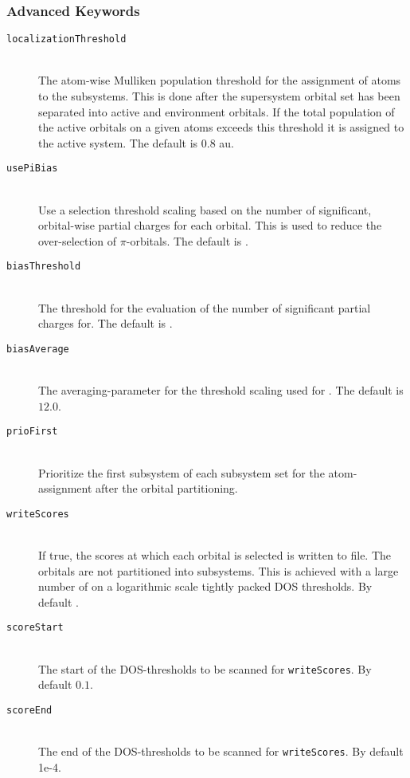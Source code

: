 \subsubsection{Advanced Keywords}
\begin{description}
    \item [\texttt{localizationThreshold}]\hfill \\
    The atom-wise Mulliken population threshold for the assignment of atoms to the subsystems. This is done
    after the supersystem orbital set has been separated into active and environment orbitals. If the total
    population of the active orbitals on a given atoms exceeds this threshold it is assigned to the active
    system. The default is $0.8$ au.
    \item [\texttt{usePiBias}]\hfill \\
    Use a selection threshold scaling based on the number of significant, orbital-wise partial charges for
    each orbital. This is used to reduce the over-selection of $\pi$-orbitals. The default is .
    \item [\texttt{biasThreshold}]\hfill \\
    The threshold for the evaluation of the number of significant partial charges for. The default is
    .
    \item [\texttt{biasAverage}]\hfill \\
    The averaging-parameter for the threshold scaling used for .
    The default is $12.0$.
    \item [\texttt{prioFirst}]\hfill \\
    Prioritize the first subsystem of each subsystem set for the atom-assignment after
    the orbital partitioning.
    \item [\texttt{writeScores}]\hfill \\
    If true, the scores at which each orbital is selected is written to file.
    The orbitals are not partitioned into subsystems.
    This is achieved with a large number of on a logarithmic scale tightly packed DOS thresholds.
    By default .
    \item [\texttt{scoreStart}]\hfill \\
    The start of the DOS-thresholds to be scanned for \texttt{writeScores}.
    By default $0.1$.
    \item [\texttt{scoreEnd}]\hfill \\
    The end of the DOS-thresholds to be scanned for \texttt{writeScores}.
    By default 1e-4.

\end{description}
